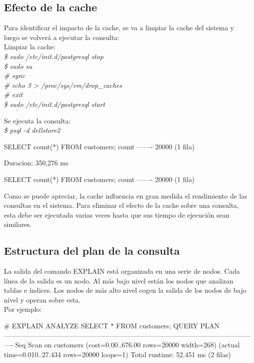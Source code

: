 \subsection{Efecto de la cache}

Para identificar el impacto de la cache, se va a limpiar la cache del sistema y luego se volverá a ejecutar la consulta:\\

Limpiar la cache:\\

\emph{
 \$ sudo /etc/init.d/postgresql stop \\
 \$ sudo su \\
 \# sync \\
 \# echo 3 > /proc/sys/vm/drop\_caches \\
 \# exit\\
 \$ sudo /etc/init.d/postgresql start\\
 }
 
Se ejecuta la consulta:\\

\emph{\$ psql -d dellstore2}

\begin{pyglist}
\timing
SELECT count(*) FROM customers;
 count 
-------
 20000
(1 fila)

Duracion: 350,276 ms

SELECT count(*) FROM customers;
 count 
-------
 20000
(1 fila)
\end{pyglist}

Como se puede apreciar, la cache influencia en gran medida el rendimiento de las consultas en el sistema. Para eliminar el efecto de la cache sobre una consulta, esta debe ser ejecutada varias veces hasta que sus tiempo de ejecución sean similares.

\subsection{Estructura del plan de la consulta}

La salida del comando EXPLAIN está organizada en una serie de nodos. Cada línea de la salida es un nodo. Al más bajo nivel están los nodos que analizan tablas e índices. Los nodos de más alto nivel cogen la salida de los nodos de bajo nivel y operan sobre esta.\\

Por ejemplo:\\

\begin{pyglist}
# EXPLAIN ANALYZE SELECT * FROM customers;
QUERY PLAN                                                   
----------------------------------------------------------------------------------------------------------------
 Seq Scan on customers  (cost=0.00..676.00 rows=20000 width=268)
  (actual time=0.010..27.434 rows=20000 loops=1)
 Total runtime: 52.451 ms
(2 filas)
\end{pyglist}

